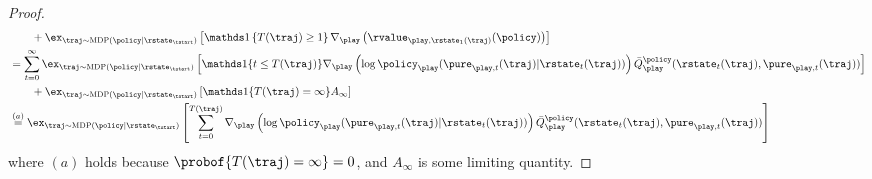 \begin{proof}
\begin{align}
		&\qquad + \ex_{\traj \sim \MDP(\policy|\rstate_{\tstart})}\left[\one\left\{T(\traj) \geq 1 \right\}\nabla_{\play}\left(\rvalue_{\play,\rstate_1(\traj)}(\policy)\right)\right]
	\notag\\
	&= \sum_{t = 0}^{\infty} \ex_{\traj \sim \MDP(\policy|\rstate_{\tstart})}\left[\one\{\time \leq T(\traj)\} \nabla_{\play}\left( \log\policy_\play(\pure_{\play,\time}(\traj) \vert \rstate_\time(\traj))\right)\bar{Q}_{\play}^{\policy}(\rstate_\time(\traj),\pure_{\play,\time}(\traj))\right]
	\notag\\
		&\qquad + \ex_{\traj \sim \MDP(\policy|\rstate_{\tstart})}\left[\one\{T(\traj) = \infty\} A_{\infty} \right]
	\notag\\
	&\stackrel{(a)}{=} \ex_{\traj \sim \MDP(\policy|\rstate_{\tstart})}\left[\sum_{t = 0}^{T(\traj)}  \nabla_{\play}\left( \log\policy_\play(\pure_{\play,\time}(\traj) \vert \rstate_\time(\traj))\right)\bar{Q}_{\play}^{\policy}(\rstate_\time(\traj),\pure_{\play,\time}(\traj))\right]
\end{align}
where $(a)$ holds because $\probof{T(\traj) = \infty} = 0$, and $A_{\infty}$ is some limiting quantity. 


\end{proof}
